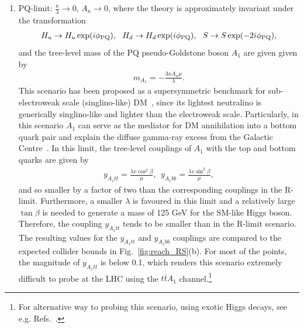 \documentclass[preprintnumbers,superscriptaddress,nofootinbib,aps,prd,floatfix]{revtex4}
\begin{document}
\begin{enumerate}
\item PQ-limit: $\frac{\kappa}{\lambda} \to 0$, $A_\kappa \to 0$, where the theory is approximately invariant under the transformation 
\begin{eqnarray}
H_u \to H_u \exp(i \phi_{\rm PQ}), \ \ H_d \to H_d \exp(i \phi_{\rm PQ}), \ \ S \to S \exp(-2i \phi_{\rm PQ}), 
\end{eqnarray}
and the tree-level mass of the PQ pseudo-Goldstone boson $A_1$ are given given by  
\begin{eqnarray}
m_{A_1} = - \frac{3 \kappa A_\kappa \mu}{\lambda}.
\end{eqnarray}
This scenario has been proposed as a supersymmetric benchmark for sub-electroweak scale (singlino-like) DM~\cite{Draper:2010ew}, since its lightest neutralino is generically singlino-like and lighter than the electroweak scale. Particularly, in this scenario $A_1$ can serve as the mediator for  DM annihilation into a bottom quark pair and explain the diffuse gamma-ray excess from the Galactic Centre~\cite{Huang:2014cla,Cheung:2014lqa}. In this limit, the tree-level couplings of $A_1$ with the top and bottom quarks are given by 
\begin{eqnarray}
y_{A_1 tt} = \frac{\lambda v \cos^2 \beta}{\mu}, \ \ y_{A_1 bb} = \frac{\lambda v \sin^2 \beta}{\mu},
\end{eqnarray}
and so smaller by a factor of two than the corresponding couplings in the R-limit. Furthermore, a smaller $\lambda$ is favoured in this limit and a relatively large $\tan\beta$ is needed to generate a mass of 125 GeV for the SM-like Higgs boson. Therefore, the coupling $y_{A_1 tt}$ tends to be smaller than in the R-limit scenario. 
The resulting values for the $y_{A_1tt}$ and $y_{A_1bb}$ couplings are compared to the expected collider bounds in Fig.~\ref{fig:reach_RS}(b).
For most of the points, the magnitude of $y_{A_1 tt}$ is below 0.1, which renders this scenario extremely difficult to probe at the LHC using the $t\bar tA_1$ channel.\footnote{For alternative way to probing this scenario, using exotic Higgs decays, see e.g. Refs.~\cite{Huang:2013ima,Huang:2014cla,Butter:2015fqa,Cao:2013gba}.}
 

\end{enumerate}
\end{document}
